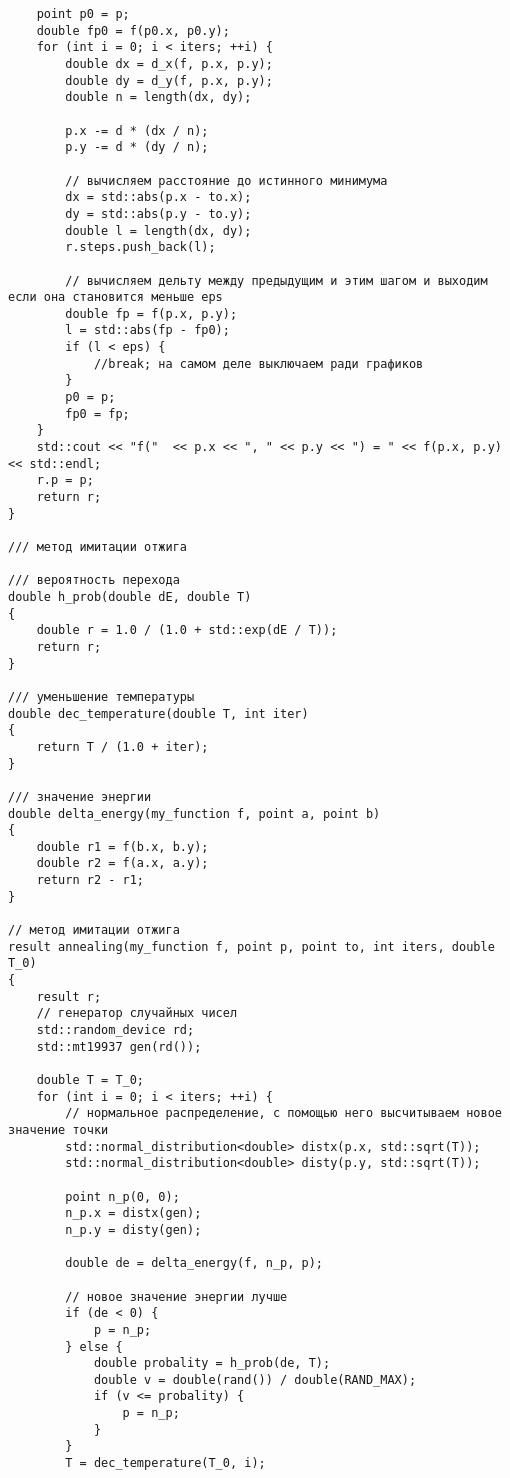 \documentclass[14pt]{matmex-diploma-custom}
\begin{document}
\begin{verbatim}
    point p0 = p;
    double fp0 = f(p0.x, p0.y);
    for (int i = 0; i < iters; ++i) {
        double dx = d_x(f, p.x, p.y);
        double dy = d_y(f, p.x, p.y);
        double n = length(dx, dy);

        p.x -= d * (dx / n);
        p.y -= d * (dy / n);

        // вычисляем расстояние до истинного минимума
        dx = std::abs(p.x - to.x);
        dy = std::abs(p.y - to.y);
        double l = length(dx, dy);
        r.steps.push_back(l);

        // вычисляем дельту между предыдущим и этим шагом и выходим если она становится меньше eps
        double fp = f(p.x, p.y);
        l = std::abs(fp - fp0);
        if (l < eps) {
            //break; на самом деле выключаем ради графиков
        }
        p0 = p;
        fp0 = fp;
    }
    std::cout << "f("  << p.x << ", " << p.y << ") = " << f(p.x, p.y) << std::endl;
    r.p = p;
    return r;
}

/// метод имитации отжига

/// вероятность перехода
double h_prob(double dE, double T)
{
    double r = 1.0 / (1.0 + std::exp(dE / T));
    return r;
}

/// уменьшение температуры
double dec_temperature(double T, int iter)
{
    return T / (1.0 + iter);
}

/// значение энергии
double delta_energy(my_function f, point a, point b)
{
    double r1 = f(b.x, b.y);
    double r2 = f(a.x, a.y);
    return r2 - r1;
}

// метод имитации отжига
result annealing(my_function f, point p, point to, int iters, double T_0)
{
    result r;
    // генератор случайных чисел
    std::random_device rd;
    std::mt19937 gen(rd());

    double T = T_0;
    for (int i = 0; i < iters; ++i) {
        // нормальное распределение, с помощью него высчитываем новое значение точки
        std::normal_distribution<double> distx(p.x, std::sqrt(T));
        std::normal_distribution<double> disty(p.y, std::sqrt(T));

        point n_p(0, 0);
        n_p.x = distx(gen);
        n_p.y = disty(gen);

        double de = delta_energy(f, n_p, p);

        // новое значение энергии лучше
        if (de < 0) {
            p = n_p;
        } else {
            double probality = h_prob(de, T);
            double v = double(rand()) / double(RAND_MAX);
            if (v <= probality) {
                p = n_p;
            }
        }
        T = dec_temperature(T_0, i);


\end{verbatim}
\end{document}
